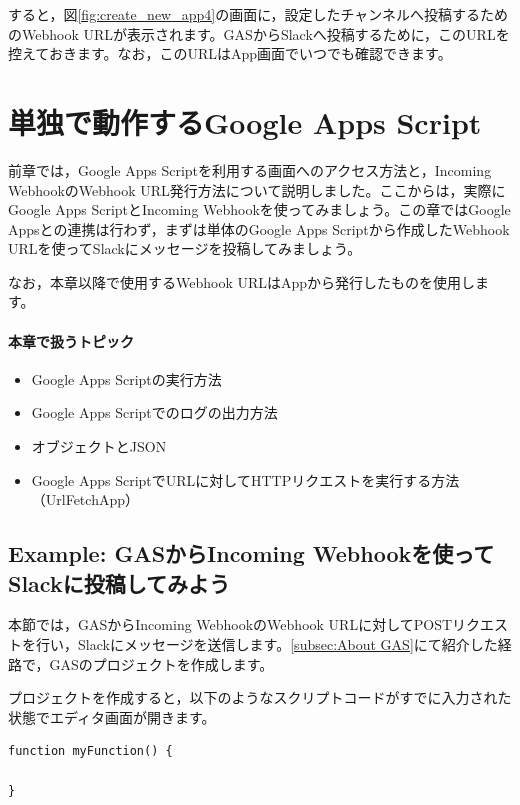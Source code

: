 \documentclass[uplatex,a4j]{jsarticle}
\begin{document}
すると，図\ref{fig:create_new_app4}の画面に，設定したチャンネルへ投稿するためのWebhook URLが表示されます。GASからSlackへ投稿するために，このURLを控えておきます。なお，このURLはApp画面でいつでも確認できます。

\clearpage
\section{単独で動作するGoogle Apps Script}

前章では，Google Apps Scriptを利用する画面へのアクセス方法と，Incoming WebhookのWebhook URL発行方法について説明しました。ここからは，実際にGoogle Apps ScriptとIncoming Webhookを使ってみましょう。この章ではGoogle Appsとの連携は行わず，まずは単体のGoogle Apps Scriptから作成したWebhook URLを使ってSlackにメッセージを投稿してみましょう。

なお，本章以降で使用するWebhook URLはAppから発行したものを使用します。

\paragraph{本章で扱うトピック}
\begin{itemize}
\item Google Apps Scriptの実行方法
\item Google Apps Scriptでのログの出力方法
\item オブジェクトとJSON
\item Google Apps ScriptでURLに対してHTTPリクエストを実行する方法（UrlFetchApp）
\end{itemize}

\subsection{Example: GASからIncoming Webhookを使ってSlackに投稿してみよう}

本節では，GASからIncoming WebhookのWebhook URLに対してPOSTリクエストを行い，Slackにメッセージを送信します。\ref{subsec:About GAS}にて紹介した経路で，GASのプロジェクトを作成します。

プロジェクトを作成すると，以下のようなスクリプトコードがすでに入力された状態でエディタ画面が開きます。

\begin{lstlisting}[basicstyle=\ttfamily\footnotesize,frame=single,caption=Default Script]
function myFunction() {

}
\end{lstlisting}
\end{document}
